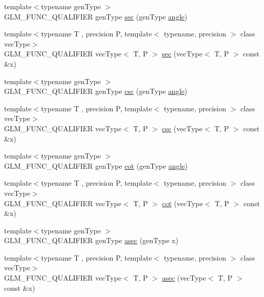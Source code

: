 \begin{DoxyCompactItemize}
{\footnotesize template$<$typename gen\+Type $>$ }\\G\+L\+M\+\_\+\+F\+U\+N\+C\+\_\+\+Q\+U\+A\+L\+I\+F\+I\+E\+R gen\+Type \hyperlink{namespaceglm_a50ae4a1b04d5ff626db13d6bb92a2c9e}{sec} (gen\+Type \hyperlink{group__gtc__quaternion_gad4a4448baedb198b2b1e7880d2544dc9}{angle})
\item 
{\footnotesize template$<$typename T , precision P, template$<$ typename, precision $>$ class vec\+Type$>$ }\\G\+L\+M\+\_\+\+F\+U\+N\+C\+\_\+\+Q\+U\+A\+L\+I\+F\+I\+E\+R vec\+Type$<$ T, P $>$ \hyperlink{namespaceglm_ab94ec38d09e409a1d0b402961a186d5d}{sec} (vec\+Type$<$ T, P $>$ const \&x)
\item 
{\footnotesize template$<$typename gen\+Type $>$ }\\G\+L\+M\+\_\+\+F\+U\+N\+C\+\_\+\+Q\+U\+A\+L\+I\+F\+I\+E\+R gen\+Type \hyperlink{namespaceglm_a5342fb605ca415a20df6895720b1cdae}{csc} (gen\+Type \hyperlink{group__gtc__quaternion_gad4a4448baedb198b2b1e7880d2544dc9}{angle})
\item 
{\footnotesize template$<$typename T , precision P, template$<$ typename, precision $>$ class vec\+Type$>$ }\\G\+L\+M\+\_\+\+F\+U\+N\+C\+\_\+\+Q\+U\+A\+L\+I\+F\+I\+E\+R vec\+Type$<$ T, P $>$ \hyperlink{namespaceglm_a3bdd2d38714ee045d866807ae9574882}{csc} (vec\+Type$<$ T, P $>$ const \&x)
\item 
{\footnotesize template$<$typename gen\+Type $>$ }\\G\+L\+M\+\_\+\+F\+U\+N\+C\+\_\+\+Q\+U\+A\+L\+I\+F\+I\+E\+R gen\+Type \hyperlink{namespaceglm_affb4cc5b308512bac40c88faa7204349}{cot} (gen\+Type \hyperlink{group__gtc__quaternion_gad4a4448baedb198b2b1e7880d2544dc9}{angle})
\item 
{\footnotesize template$<$typename T , precision P, template$<$ typename, precision $>$ class vec\+Type$>$ }\\G\+L\+M\+\_\+\+F\+U\+N\+C\+\_\+\+Q\+U\+A\+L\+I\+F\+I\+E\+R vec\+Type$<$ T, P $>$ \hyperlink{namespaceglm_a77c21bbfc00f4c06152bec335e01842b}{cot} (vec\+Type$<$ T, P $>$ const \&x)
\item 
{\footnotesize template$<$typename gen\+Type $>$ }\\G\+L\+M\+\_\+\+F\+U\+N\+C\+\_\+\+Q\+U\+A\+L\+I\+F\+I\+E\+R gen\+Type \hyperlink{namespaceglm_a315e5fee4f9d52147c9507993d404c0b}{asec} (gen\+Type x)
\item 
{\footnotesize template$<$typename T , precision P, template$<$ typename, precision $>$ class vec\+Type$>$ }\\G\+L\+M\+\_\+\+F\+U\+N\+C\+\_\+\+Q\+U\+A\+L\+I\+F\+I\+E\+R vec\+Type$<$ T, P $>$ \hyperlink{namespaceglm_ad7641a007eb14df8822245d8e13c90bb}{asec} (vec\+Type$<$ T, P $>$ const \&x)

\end{DoxyCompactItemize}
